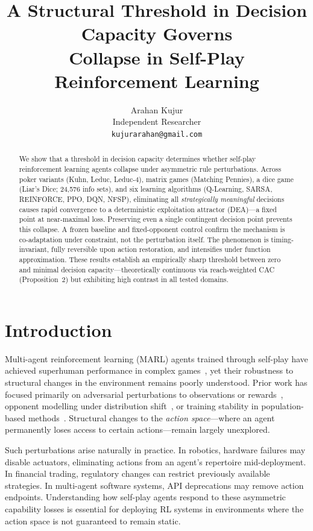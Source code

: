\documentclass{article}
\title{A Structural Threshold in Decision Capacity Governs\\Collapse in Self-Play Reinforcement Learning}
\author{
  Arahan Kujur\\
  Independent Researcher\\
  \texttt{kujurarahan@gmail.com}
}
\begin{document}
\maketitle

\begin{abstract}
We show that a threshold in decision capacity determines whether self-play reinforcement learning agents collapse under asymmetric rule perturbations. Across poker variants (Kuhn, Leduc, Leduc-4), matrix games (Matching Pennies), a dice game (Liar's Dice; 24{,}576 info sets), and six learning algorithms (Q-Learning, SARSA, REINFORCE, PPO, DQN, NFSP), eliminating all \emph{strategically meaningful} decisions causes rapid convergence to a deterministic exploitation attractor (DEA)---a fixed point at near-maximal loss. Preserving even a single contingent decision point prevents this collapse. A frozen baseline and fixed-opponent control confirm the mechanism is co-adaptation under constraint, not the perturbation itself. The phenomenon is timing-invariant, fully reversible upon action restoration, and intensifies under function approximation. These results establish an empirically sharp threshold between zero and minimal decision capacity---theoretically continuous via reach-weighted CAC (Proposition~2) but exhibiting high contrast in all tested domains.
\end{abstract}

\section{Introduction}

Multi-agent reinforcement learning (MARL) agents trained through self-play have achieved superhuman performance in complex games~\citep{silver2018general,brown2019superhuman,vinyals2019grandmaster}, yet their robustness to structural changes in the environment remains poorly understood. Prior work has focused primarily on adversarial perturbations to observations or rewards~\citep{gleave2020adversarial}, opponent modelling under distribution shift~\citep{foerster2018learning}, or training stability in population-based methods~\citep{balduzzi2019open}. Structural changes to the \emph{action space}---where an agent permanently loses access to certain actions---remain largely unexplored.

Such perturbations arise naturally in practice. In robotics, hardware failures may disable actuators, eliminating actions from an agent's repertoire mid-deployment. In financial trading, regulatory changes can restrict previously available strategies. In multi-agent software systems, API deprecations may remove action endpoints. Understanding how self-play agents respond to these asymmetric capability losses is essential for deploying RL systems in environments where the action space is not guaranteed to remain static.
\end{document}
